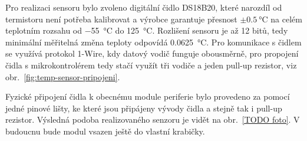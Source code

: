         Pro realizaci sensoru bylo zvoleno digitální čidlo DS18B20, které narozdíl od termistoru není potřeba kalibrovat a výrobce garantuje přesnost \(\pm \qty{0.5}{\degreeCelsius}\) na celém teplotním rozsahu od \qty{-55}{\degreeCelsius} do \qty{+125}{\degreeCelsius}. Rozlišení sensoru je až 12 bitů, tedy minimální měřitelná změna teploty odpovídá \qty{0.0625}{\degreeCelsius}. Pro komunikace s čidlem se využívá protokol 1-Wire, kdy datový vodič funguje obousměrně, pro propojení čidla s mikrokontrolérem tedy stačí využít tři vodiče a jeden pull-up rezistor, viz obr.~\ref{fig:temp-sensor-pripojeni}. 
        
        Fyzické připojení čidla k obecnému module periferie bylo provedeno za pomocí jedné pinové lišty, ke které jsou připájeny vývody čidla a stejně tak i pull-up rezistor. Výsledná podoba realizovaného senzoru je vidět na obr.~\ref{TODO foto}. V budoucnu bude modul vsazen ještě do vlastní krabičky.